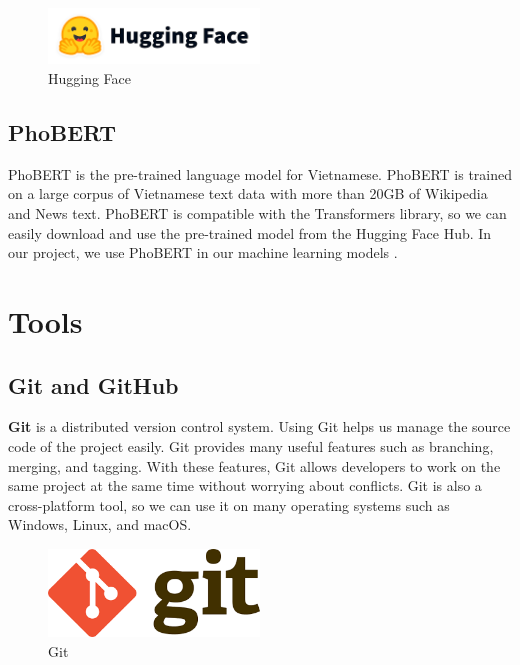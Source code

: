 \begin{figure}[ht]
    \centering
    \includegraphics[width=0.5\textwidth]{../Images/8.Technology_Stack/huggingface_logo.png}
    \caption{Hugging Face}
    \label{fig:huggingface}
\end{figure}

\subsection{PhoBERT}
PhoBERT is the pre-trained language model for Vietnamese. PhoBERT is trained on a large corpus of Vietnamese text data with more than 20GB of Wikipedia and News text. PhoBERT is compatible with the Transformers library, so we can easily download and use the pre-trained model from the Hugging Face Hub. In our project, we use PhoBERT in our machine learning models \cite{phobert}.

\section{Tools}

\subsection{Git and GitHub}
\textbf{Git} is a distributed version control system. Using Git helps us manage the source code of the project easily. Git provides many useful features such as branching, merging, and tagging. With these features, Git allows developers to work on the same project at the same time without worrying about conflicts. Git is also a cross-platform tool, so we can use it on many operating systems such as Windows, Linux, and macOS.

\begin{figure}[ht]
    \centering
    \includegraphics[width=0.5\textwidth]{../Images/8.Technology_Stack/git_logo.png}
    \caption{Git}
    \label{fig:git}
\end{figure}

